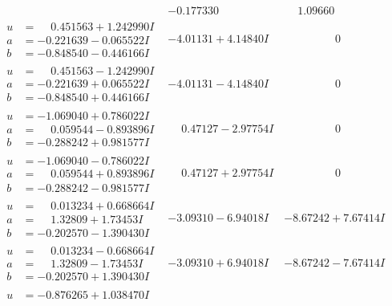 \documentclass[1p]{elsarticle_modified}
\theoremstyle{definition}
\begin{document}
$$\begin{array}{c|c|c}
 & -0.177330\phantom{ +0.000000I} & \phantom{-}1.09660\phantom{ +0.000000I} \\ \hline\begin{aligned}
u &= \phantom{-}0.451563 + 1.242990 I \\
a &= -0.221639 - 0.065522 I \\
b &= -0.848540 - 0.446166 I\end{aligned}
 & -4.01131 + 4.14840 I & \phantom{-0.000000 } 0 \\ \hline\begin{aligned}
u &= \phantom{-}0.451563 - 1.242990 I \\
a &= -0.221639 + 0.065522 I \\
b &= -0.848540 + 0.446166 I\end{aligned}
 & -4.01131 - 4.14840 I & \phantom{-0.000000 } 0 \\ \hline\begin{aligned}
u &= -1.069040 + 0.786022 I \\
a &= \phantom{-}0.059544 - 0.893896 I \\
b &= -0.288242 + 0.981577 I\end{aligned}
 & \phantom{-}0.47127 - 2.97754 I & \phantom{-0.000000 } 0 \\ \hline\begin{aligned}
u &= -1.069040 - 0.786022 I \\
a &= \phantom{-}0.059544 + 0.893896 I \\
b &= -0.288242 - 0.981577 I\end{aligned}
 & \phantom{-}0.47127 + 2.97754 I & \phantom{-0.000000 } 0 \\ \hline\begin{aligned}
u &= \phantom{-}0.013234 + 0.668664 I \\
a &= \phantom{-}1.32809 + 1.73453 I \\
b &= -0.202570 - 1.390430 I\end{aligned}
 & -3.09310 - 6.94018 I & -8.67242 + 7.67414 I \\ \hline\begin{aligned}
u &= \phantom{-}0.013234 - 0.668664 I \\
a &= \phantom{-}1.32809 - 1.73453 I \\
b &= -0.202570 + 1.390430 I\end{aligned}
 & -3.09310 + 6.94018 I & -8.67242 - 7.67414 I \\ \hline\begin{aligned}
u &= -0.876265 + 1.038470 I \\

\end{aligned}
\end{array}$$
\end{document}
